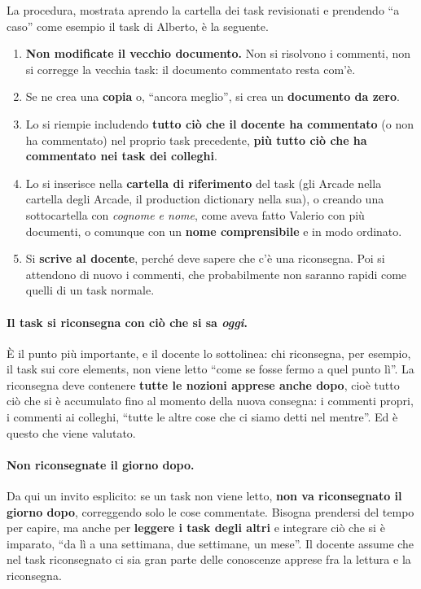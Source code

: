 La procedura, mostrata aprendo la cartella dei task revisionati e prendendo
``a caso'' come esempio il task di Alberto, è la seguente.
\begin{enumerate}
  \item \textbf{Non modificate il vecchio documento.} Non si risolvono i
        commenti, non si corregge la vecchia task: il documento commentato
        resta com'è.
  \item Se ne crea una \textbf{copia} o, ``ancora meglio'', si crea un
        \textbf{documento da zero}.
  \item Lo si riempie includendo \textbf{tutto ciò che il docente ha
        commentato} (o non ha commentato) nel proprio task precedente,
        \textbf{più tutto ciò che ha commentato nei task dei colleghi}.
  \item Lo si inserisce nella \textbf{cartella di riferimento} del task
        (gli Arcade nella cartella degli Arcade, il production dictionary
        nella sua), o creando una sottocartella con \emph{cognome e nome},
        come aveva fatto Valerio con più documenti, o comunque con un
        \textbf{nome comprensibile} e in modo ordinato.
  \item Si \textbf{scrive al docente}, perché deve sapere che c'è una
        riconsegna. Poi si attendono di nuovo i commenti, che probabilmente
        non saranno rapidi come quelli di un task normale.
\end{enumerate}

\paragraph{Il task si riconsegna con ciò che si sa \emph{oggi}.} È il punto
più importante, e il docente lo sottolinea: chi riconsegna, per esempio, il
task sui core elements, non viene letto ``come se fosse fermo a quel punto
lì''. La riconsegna deve contenere \textbf{tutte le nozioni apprese anche
dopo}, cioè tutto ciò che si è accumulato fino al momento della nuova
consegna: i commenti propri, i commenti ai colleghi, ``tutte le altre cose
che ci siamo detti nel mentre''. Ed è questo che viene valutato.

\paragraph{Non riconsegnate il giorno dopo.} Da qui un invito esplicito: se
un task non viene letto, \textbf{non va riconsegnato il giorno dopo},
correggendo solo le cose commentate. Bisogna prendersi del tempo per capire,
ma anche per \textbf{leggere i task degli altri} e integrare ciò che si è
imparato, ``da lì a una settimana, due settimane, un mese''. Il docente
assume che nel task riconsegnato ci sia gran parte delle conoscenze apprese
fra la lettura e la riconsegna.

